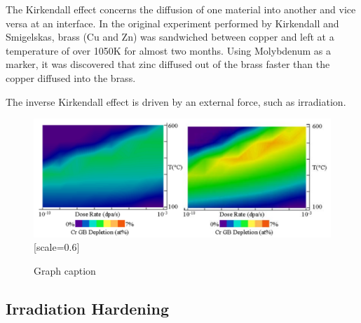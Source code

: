 The Kirkendall effect concerns the diffusion of one material into another and vice versa at an interface.  In the original experiment performed by Kirkendall and Smigelskas, brass (Cu and Zn) was sandwiched between copper and left at a temperature of over 1050K for almost two months.  Using Molybdenum as a marker, it was discovered that zinc diffused out of the brass faster than the copper diffused into the brass.  

The inverse Kirkendall effect is driven by an external force, such as irradiation.



\begin{figure}[h]
  \begin{center}
    \includegraphics[scale=0.70]{chapters/background_austenitic_steels_in_nuclear/images/crseg.png}[scale=0.6]
    \caption{Graph caption}
    \label{graph:graph1}
  \end{center}
\end{figure}



\subsection{Irradiation Hardening}



